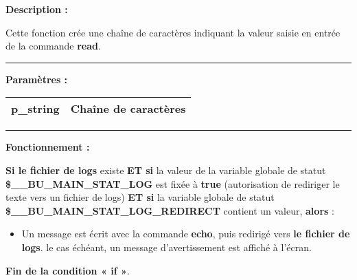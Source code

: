 \documentclass[a4paper,10pt]{article}
\begin{document}
\begin{justify}
    \textbf{Description :}

    Cette fonction crée une chaîne de caractères indiquant la valeur saisie en entrée de la commande \textbf{\color{cmds}read}.
\end{justify}


\par\noindent\rule{\textwidth}{0.4pt}

\begin{justify}
    \textbf{Paramètres :}

    \begin{tabular}{|l|l|}
        \hline
        \textbf{\color{vars}p\_string} & Chaîne de caractères\\
        \hline
    \end{tabular}
\end{justify}


\par\noindent\rule{\textwidth}{0.4pt}

\begin{justify}
    \textbf{Fonctionnement :}

    \textbf{\color{cond}Si \color{path}le fichier de logs} existe \textbf{\color{cond}ET si} la valeur de la variable globale de statut \textbf{\color{vars}\$\_\_BU\_MAIN\_STAT\_LOG} est fixée à \textbf{true} (autorisation de rediriger le texte vers un fichier de logs) \textbf{\color{cond}ET si} la variable globale de statut \textbf{\color{vars}\$\_\_BU\_MAIN\_STAT\_LOG\_REDIRECT} contient un valeur, \textbf{\color{cond}alors} : 

    \begin{itemize}
        \item
        {
            \begin{justify}
                Un message est écrit avec la commande \textbf{\color{cmds}echo}, puis redirigé vers \textbf{\color{path}le fichier de logs}. le cas échéant, un message d'avertissement est affiché à l'écran.
            \end{justify}
        }
    \end{itemize}
\end{justify}

\begin{justify}
    \textbf{\color{cond}Fin de la condition « if »}.
\end{justify}
\end{document}
